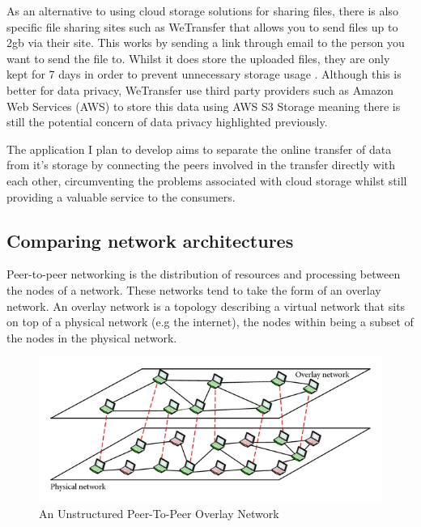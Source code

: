 \documentclass[]{report}
\begin{document}
			As an alternative to using cloud storage solutions for sharing files, there is also specific file sharing sites such as WeTransfer that allows you to send files up to 2gb via their site. This works by sending a link through email to the person you want to send the file to. Whilst it does store the uploaded files, they are only kept for 7 days in order to prevent unnecessary storage usage \cite{WeTransfer Storage Time}. Although this is better for data privacy, WeTransfer use third party providers such as Amazon Web Services (AWS) to store this data using AWS S3 Storage \cite{WeTransfer AWS Case Study} meaning there is still the potential concern of data privacy highlighted previously.
			
			 The application I plan to develop aims to separate the online transfer of data from it's storage by connecting the peers involved in the transfer directly with each other, circumventing the problems associated with cloud storage whilst still providing a valuable service to the consumers.
			 
		\subsection*{Comparing network architectures}	
			Peer-to-peer networking is the distribution of resources and processing between the nodes of a network. These networks tend to take the form of an overlay network. An overlay network is a topology describing a virtual network that sits on top of a physical network (e.g the internet), the nodes within being a subset of the nodes in the physical network. 
			
			\begin{figure}[h]
			    \caption{
			    	An Unstructured Peer-To-Peer Overlay Network 	
			    	\cite{Unstructured P2P Diagram}
			    	}
				\centering
					\includegraphics{overlaynetwork.jpg}
			\end{figure}
			
\end{document}
